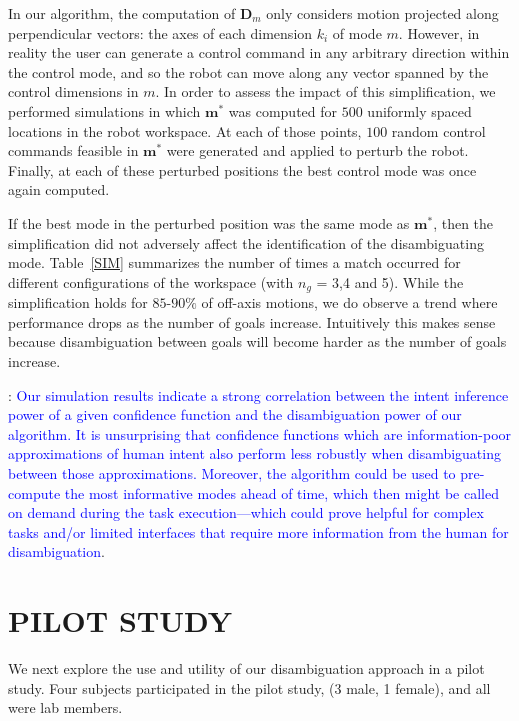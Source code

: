 \documentclass[conference]{IEEEtran}
\begin{document}
 In our algorithm, the computation of $\boldsymbol{D}_{m}$ only considers motion projected along perpendicular vectors: the axes of each dimension $k_i$ of mode $m$. However, in reality the user can generate a control command in any arbitrary direction within the control mode, and so the robot can move along any vector spanned by the control dimensions in $m$. In order to assess the impact of this simplification, we performed simulations in which $\boldsymbol{m}^*$ was computed for $500$ uniformly spaced locations in the robot workspace. At each of those points, $100$ random control commands feasible in $\boldsymbol{m}^*$ were generated and applied to perturb the robot. Finally, at each of these perturbed positions the best control mode was once again computed. 

If the best mode in the perturbed position was the same mode as $\boldsymbol{m}^*$, then the simplification did not adversely affect the identification of the disambiguating mode. Table~\ref{SIM} summarizes the number of times a match occurred for different configurations of the workspace (with $n_g$ = 3,4 and 5). While the simplification holds for $85$-$90\%$ of off-axis motions, we do observe a trend where performance drops as the number of goals increase. Intuitively this makes sense because disambiguation between goals will become harder as the number of goals increase. 
 
:  \textcolor{blue}{Our simulation results indicate a strong correlation between the intent inference power of a given confidence function and the disambiguation power of our algorithm. It is unsurprising that confidence functions which are information-poor approximations of human intent also perform less robustly when disambiguating between those approximations.
 Moreover, the algorithm could be used to pre-compute the most informative modes ahead of time, which then might be called on demand during the task execution---which could prove helpful for complex tasks and/or limited interfaces that require more information from the human for disambiguation}. 
 \section{PILOT STUDY} \label{EXP}
 We next explore the use and utility of our disambiguation approach in a pilot study. Four subjects participated in the pilot study, (3 male, 1 female), and all were lab members.
\end{document}
